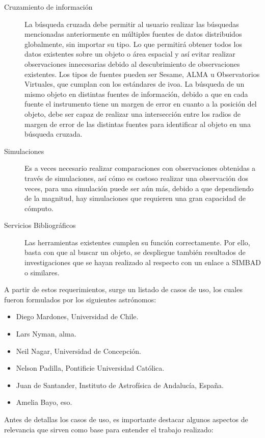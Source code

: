 \begin{description}
	\item[Cruzamiento de información] La búsqueda cruzada debe permitir al usuario realizar las búsquedas mencionadas anteriormente	en múltiples fuentes de datos distribuidos globalmente, sin importar su tipo. Lo que permitirá obtener todos los datos existentes sobre un objeto o área espacial y así evitar realizar observaciones innecesarias debido al descubrimiento de observaciones existentes. Los tipos de fuentes pueden ser Sesame, ALMA u Observatorios Virtuales, que cumplan con los estándares de \gls{ivoa}. La búsqueda de un mismo objeto en distintas fuentes de información, debido a que en cada fuente el instrumento tiene un margen de error en cuanto a la posición del objeto, debe ser capaz de realizar	una intersección entre los radios de margen de error de las distintas fuentes para identificar al objeto en una búsqueda cruzada.
	\item[Simulaciones] Es a veces necesario realizar comparaciones con observaciones obtenidas a trav\'es de simulaciones,	así cómo es costoso realizar una observación dos veces, para una simulación puede ser aún más, debido a que dependiendo de la magnitud, hay simulaciones que requieren una gran capacidad de cómputo.
	\item[Servicios Bibliográficos] Las herramientas existentes cumplen su función correctamente. Por ello, basta con que al buscar un objeto, se despliegue tambi\'en resultados de investigaciones que se hayan realizado al respecto con	un enlace a SIMBAD o similares.
\end{description}

A partir de estos requerimientos, surge un listado de casos de uso, los cuales fueron formulados por los siguientes astrónomos:

\begin{itemize}
	\item Diego Mardones, Universidad de Chile.
	\item Lars Nyman, \gls{alma}.
	\item Neil Nagar, Universidad de Concepción.
	\item Nelson Padilla, Pontificie Universidad Católica. 
	\item Juan de Santander, Instituto de Astrofísica de Andalucía, España.
	\item Amelia Bayo, \gls{eso}.
\end{itemize}

Antes de detallas los casos de uso, es importante destacar algunos aspectos de relevancia que sirven como base para entender el trabajo realizado:

